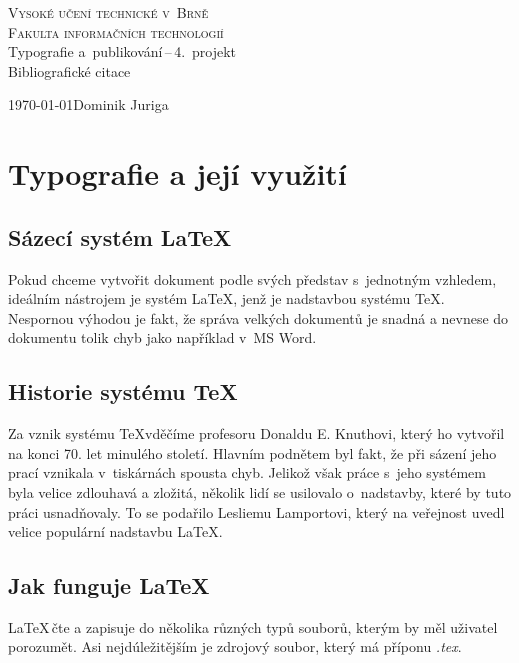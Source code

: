 \documentclass[a4paper, 11pt]{article}
\begin{document}
\begin{titlepage}
\begin{center}
	\Huge \textsc{Vysoké učení technické v~Brně} \\
	\huge \textsc{Fakulta informačních technologií} \\
	\LARGE Typografie a~publikování\,--\,4.~projekt \\
	\Huge Bibliografické citace
\end{center}

{\Large
	\today \hfill Dominik Juriga
}
\end{titlepage}

	\section{Typografie a její využití}
	
	\subsection{Sázecí systém \LaTeX}
	Pokud chceme vytvořit dokument podle svých představ s~jednotným vzhledem, ideálním nástrojem je systém \LaTeX, jenž je nadstavbou systému \TeX. Nespornou výhodou je fakt, že správa velkých dokumentů je snadná a nevnese do dokumentu tolik chyb jako například v~MS Word. \cite{Sokol_diplomovka}
	
	\subsection{Historie systému \TeX}
	Za vznik systému \TeX vděčíme profesoru Donaldu E. Knuthovi, který ho vytvořil na konci 70. let minulého století. Hlavním podnětem byl fakt, že při sázení jeho prací vznikala v~tiskárnách spousta chyb. \cite{Simek_bakalarka}
	Jelikož však práce s~jeho systémem byla velice zdlouhavá a zložitá, několik lidí se usilovalo o~nadstavby, které by tuto práci usnadňovaly. To se podařilo Lesliemu Lamportovi, který na veřejnost uvedl velice populární nadstavbu \LaTeX. \cite{LaTeX_Educational}
	
	\subsection{Jak funguje \LaTeX}
	\LaTeX \,čte a zapisuje do několika různých typů souborů, kterým by měl uživatel porozumět. Asi nejdúležitějším je zdrojový soubor, který má příponu \emph{.tex}. \cite{LaTeX_companion}
	
\end{document}
